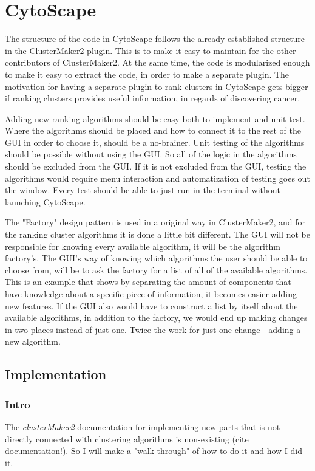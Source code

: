 \part{CytoScape} %
The structure of the code in CytoScape follows the already established structure
in the ClusterMaker2 plugin. This is to make it easy to maintain for the other
contributors of ClusterMaker2. At the same time, the code is modularized enough
to make it easy to extract the code, in order to make a separate plugin. The
motivation for having a separate plugin to rank clusters in CytoScape gets
bigger if ranking clusters provides useful information, in regards of
discovering cancer.

Adding new ranking algorithms should be easy both to implement and unit test.
Where the algorithms should be placed and how to connect it to the rest of the
GUI in order to choose it, should be a no-brainer. Unit testing of the
algorithms should be possible without using the GUI. So all of the logic in the
algorithms should be excluded from the GUI. If it is not excluded from the GUI,
testing the algorithms would require menu interaction and automatization of
testing goes out the window. Every test should be able to just run in the
terminal without launching CytoScape.

The "Factory" design pattern %
is used in a original way in ClusterMaker2, and for the ranking cluster
algorithms it is done a little bit different.  The GUI will not be responsible
for knowing every available algorithm, it will be the algorithm factory's. The
GUI's way of knowing which algorithms the user should be able to choose from,
will be to ask the factory for a list of all of the available algorithms. This
is an example that shows by separating the amount of components that have
knowledge about a specific piece of information, it becomes easier adding new
features. If the GUI also would have to construct a list by itself about the
available algorithms, in addition to the factory, we would end up making changes
in two places instead of just one. Twice the work for just one change - adding a
new algorithm.

\chapter{Implementation}

\section{Intro}
The \textit{clusterMaker2} documentation for implementing new parts that is not
directly connected with clustering algorithms is non-existing (cite
documentation!). So I will make a "walk through" of how to do it and how I did it.

